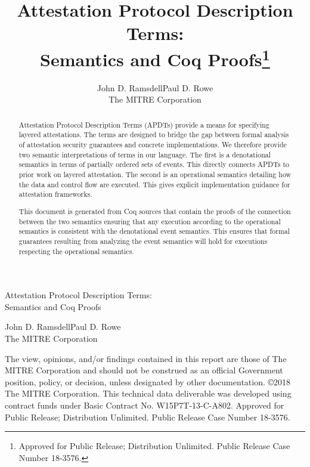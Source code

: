 \documentclass[12pt]{report}
\title{Attestation Protocol Description Terms:\\
  Semantics and Coq Proofs\thanks{Approved for Public Release;
    Distribution Unlimited. Public Release Case Number 18-3576.}}
\author{John D. Ramsdell\qquad\qquad Paul D. Rowe\\[3ex]
  The MITRE Corporation}
\begin{document}
\begin{titlepage}
  \vspace*{7ex}
  \begin{center}\LARGE
    Attestation Protocol Description Terms:\\
    Semantics and Coq Proofs
  \end{center}
  \vspace{3ex}
  \begin{center}\Large
    John D. Ramsdell\qquad\qquad Paul D. Rowe\\[3ex]
    The MITRE Corporation
  \end{center}
  \vfill
  The view, opinions, and/or findings contained in this report are
  those of The MITRE Corporation and should not be construed as an
  official Government position, policy, or decision, unless designated
  by other documentation.
  \noindent\copyright 2018 The MITRE Corporation. This technical data
  deliverable was developed using contract funds under Basic Contract
  No. W15P7T-13-C-A802.
  \noindent Approved for Public Release;
  Distribution Unlimited. Public Release Case Number 18-3576.
\end{titlepage}


\begin{abstract}
  Attestation Protocol Description Terms (APDTs) provide a means for
  specifying layered attestations.  The terms are designed to bridge
  the gap between formal analysis of attestation security guarantees
  and concrete implementations.  We therefore provide two semantic
  interpretations of terms in our language.  The first is a
  denotational semantics in terms of partially ordered sets of
  events.  This directly connects APDTs to prior work on layered
  attestation.  The second is an operational semantics detailing how
  the data and control flow are executed.  This gives explicit
  implementation guidance for attestation frameworks.

  This document is generated from Coq sources that contain the proofs
  of the connection between the two semantics ensuring that any
  execution according to the operational semantics is consistent with
  the denotational event semantics.  This ensures that formal
  guarantees resulting from analyzing the event semantics will hold
  for executions respecting the operational semantics.
\end{abstract}
\end{document}
